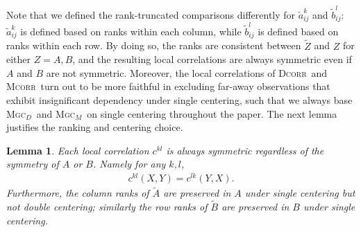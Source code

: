 \documentclass[11pt]{article}
\providecommand{\sct}[1]{{\normalfont\textsc{#1}}}
\providecommand{\mt}[1]{\widetilde{#1}}
\newcommand{\GG}{c}
\newcommand{\Mgcd}{\sct{Mgc$_D$}}
\newcommand{\Mgcm}{\sct{Mgc$_M$}}
\newcommand{\Dcorr}{\sct{Dcorr}}
\newcommand{\Mcorr}{\sct{Mcorr}}
\newtheorem{lem}{Lemma}
\begin{document}
Note that we defined the rank-truncated comparisons differently for $\mt{a}_{ij}^k$ and $\mt{b}_{ij}^l$: $\mt{a}_{ij}^k$ is defined based on ranks within each column, while $\mt{b}_{ij}^l$ is defined based on ranks within each row. By doing so, the ranks are consistent between $\tilde{Z}$ and $Z$ for either $Z=A,B$, and the resulting local correlations are always symmetric even if $A$ and $B$ are not symmetric. Moreover, the local correlations of \Dcorr~and \Mcorr~turn out to be more faithful in excluding far-away observations that exhibit insignificant dependency under single centering, such that we always base \Mgcd~and \Mgcm~on single centering throughout the paper. The next lemma justifies the ranking and centering choice.

\begin{lem}
\label{lem2}
Each local correlation $\GG^{kl}$ is always symmetric regardless of the symmetry of $A$ or $B$. Namely for any $k,l$, 
\begin{align*}
\GG^{kl}(X,Y)=\GG^{lk}(Y,X).
\end{align*}
Furthermore, the column ranks of $\tilde{A}$ are preserved in $A$ under single centering but not double centering; similarly the row ranks of $\tilde{B}$ are preserved in $B$ under single centering.
\end{lem}
\end{document}
